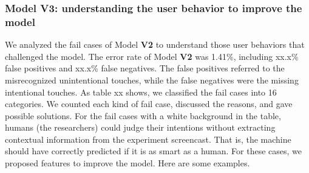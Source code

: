 

\subsubsection{Model V3: understanding the user behavior to  improve the model}

We analyzed the fail cases of Model \textbf{V2} to understand those user behaviors that challenged the model. The error rate of Model \textbf{V2} was 1.41\%, including xx.x\% false positives and xx.x\% false negatives. The false positives referred to the misrecognized unintentional touches, while the false negatives were the missing intentional touches. As table xx shows, we classified the fail cases into 16 categories. We counted each kind of fail case, discussed the reasons, and gave possible solutions. For the fail cases with a white background in the table, humans (the researchers) could judge their intentions without extracting contextual information from the experiment screencast. That is, the machine should have correctly predicted if it is as smart as a human. For these cases, we proposed features to improve the model. Here are some examples.


